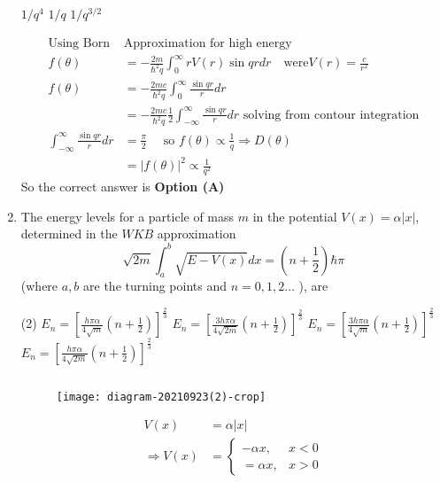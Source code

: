 \begin{enumerate}
\begin{tasks}
\task[\textbf{B.}] $1 / q^{4}$
\task[\textbf{C.}]  $1 / q$
\task[\textbf{D.}] $1 / q^{3 / 2}$
\end{tasks}
\begin{answer}
	$$
\begin{aligned}
\text{Using Born }&\text{Approximation for high energy}\\
f(\theta)&=-\frac{2 m}{\hbar^{2} q} \int_{0}^{\infty} r V(r) \sin q r d r \quad\text{were} V(r)=\frac{c}{r^{2}}\\
f(\theta)&=-\frac{2 m c}{\hbar^{2} q} \int_{0}^{\infty} \frac{\sin q r}{r} d r\\&=-\frac{2 m c}{\hbar^{2} q} \frac{1}{2} \int_{-\infty}^{\infty} \frac{\sin q r}{r} d r\text{ solving from contour integration}\\
\int_{-\infty}^{\infty} \frac{\sin q r}{r} d r&=\frac{\pi}{2} \quad\text{ so }f(\theta) \propto \frac{1}{q} \Rightarrow D(\theta)\\&=|f(\theta)|^{2} \propto \frac{1}{q^{2}}
\end{aligned}
$$
So the correct answer is \textbf{Option (A)}
\end{answer}	
\item 	 The energy levels for a particle of mass $m$ in the potential $V(x)=\alpha|x|$, determined in the $W K B$ approximation
$$
\sqrt{2 m} \int_{a}^{b} \sqrt{E-V(x)} d x=\left(n+\frac{1}{2}\right) \hbar \pi
$$
(where $a, b$ are the turning points and $n=0,1,2 \ldots$ ), are
{}
\begin{tasks}(2)
\task[\textbf{A.}] $E_{n}=\left[\frac{h \pi \alpha}{4 \sqrt{m}}\left(n+\frac{1}{2}\right)\right]^{\frac{2}{3}}$
\task[\textbf{B.}] $E_{n}=\left[\frac{3 h \pi \alpha}{4 \sqrt{2 m}}\left(n+\frac{1}{2}\right)\right]^{\frac{2}{3}}$
\task[\textbf{C.}] $E_{n}=\left[\frac{3 h \pi \alpha}{4 \sqrt{m}}\left(n+\frac{1}{2}\right)\right]^{\frac{2}{3}}$
\task[\textbf{D.}] $E_{n}=\left[\frac{h \pi \alpha}{4 \sqrt{2 m}}\left(n+\frac{1}{2}\right)\right]^{\frac{2}{3}}$
\end{tasks}
\begin{answer}$\left. \right. $
\begin{figure}[H]
	\centering
	\texttt{[image: diagram-20210923(2)-crop]}
\end{figure}
$$
\begin{aligned}
V(x)&=\alpha|x|\\
\Rightarrow V(x)&=\left\{\begin{array}{ll}-\alpha x, & x<0 \\ =\alpha x, & x>0\end{array}\right.\\

\end{aligned}$$
\end{answer}
\end{enumerate}
